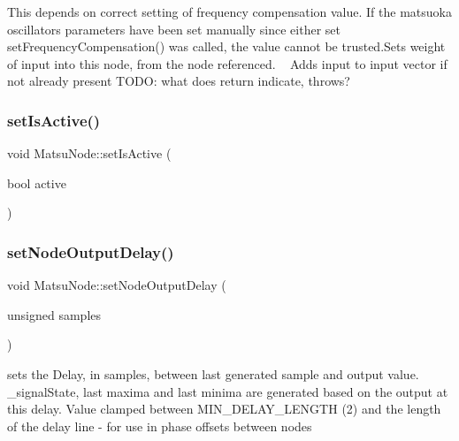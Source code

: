 This depends on correct setting of frequency compensation value. If the matsuoka oscillator\textquotesingle{}s parameters have been set manually since either set set\+Frequency\+Compensation() was called, the value cannot be trusted.\+Sets weight of input into this node, from the node referenced. ~\newline
 Adds input to input vector if not already present T\+O\+DO\+: what does return indicate, throws? \mbox{\label{classMatsuNode_a120dfca98155fded8d1ccac0f5236ecd}} 
\subsubsection{\texorpdfstring{set\+Is\+Active()}{setIsActive()}}
{\footnotesize\ttfamily void Matsu\+Node\+::set\+Is\+Active (\begin{DoxyParamCaption}\item[{bool}]{active }\end{DoxyParamCaption})\hspace{0.3cm}{\ttfamily [inline]}}

\mbox{\label{classMatsuNode_ae4d26af98e34d1595cb9cc65a89ea8ff}} 
\subsubsection{\texorpdfstring{set\+Node\+Output\+Delay()}{setNodeOutputDelay()}}
{\footnotesize\ttfamily void Matsu\+Node\+::set\+Node\+Output\+Delay (\begin{DoxyParamCaption}\item[{unsigned}]{samples }\end{DoxyParamCaption})}

sets the Delay, in samples, between last generated sample and output value. \+\_\+signal\+State, last maxima and last minima are generated based on the output at this delay. Value clamped between M\+I\+N\+\_\+\+D\+E\+L\+A\+Y\+\_\+\+L\+E\+N\+G\+TH (2) and the length of the delay line -\/ for use in phase offsets between nodes \mbox{\label{classMatsuNode_aa207e9b0d5de53e9aa1c84f3aae46178}} 
